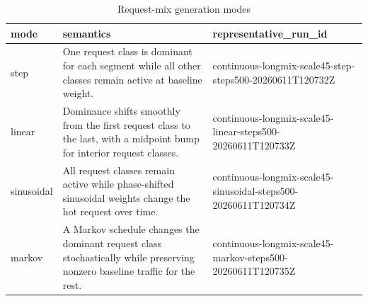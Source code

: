 \begin{table}[t]
\centering
\caption{Request-mix generation modes}
\label{tab:request_mix_modes}
\scriptsize
\begin{tabular}{lll}
\toprule
mode & semantics & representative\_run\_id \\
\midrule
step & One request class is dominant for each segment while all other classes remain active at baseline weight. & continuous-longmix-scale45-step-steps500-20260611T120732Z \\
linear & Dominance shifts smoothly from the first request class to the last, with a midpoint bump for interior request classes. & continuous-longmix-scale45-linear-steps500-20260611T120733Z \\
sinusoidal & All request classes remain active while phase-shifted sinusoidal weights change the hot request over time. & continuous-longmix-scale45-sinusoidal-steps500-20260611T120734Z \\
markov & A Markov schedule changes the dominant request class stochastically while preserving nonzero baseline traffic for the rest. & continuous-longmix-scale45-markov-steps500-20260611T120735Z \\
\bottomrule
\end{tabular}
\end{table}
